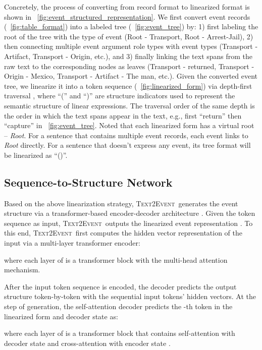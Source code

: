 \documentclass[11pt,a4paper]{article}
\newcommand\modelname{\textsc{Text2Event}}
\begin{document}
Concretely, the process of converting from record format to linearized format is shown in \figurename~\ref{fig:event_structured_representation}.
We first convert event records (\figurename~\ref{fig:table_format}) into a labeled tree (\figurename~\ref{fig:event_tree}) by:
1) first labeling the root of the tree with the type of event (Root - Transport, Root - Arrest-Jail),
2) then connecting multiple event argument role types with event types (Transport - Artifact, Transport - Origin, etc.),
and 3) finally linking the text spans from the raw text to the corresponding nodes as leaves (Transport - returned, Transport - Origin - Mexico, Transport - Artifact - The man, etc.).
Given the converted event tree, we linearize it into a token sequence (\figurename~\ref{fig:linearized_form}) via depth-first traversal \citep{NIPS2015_277281aa}, where ``('' and ``)'' are structure indicators used to represent the semantic structure of linear expressions.
The traversal order of the same depth is the order in which the text spans appear in the text, e.g., first ``return'' then ``capture'' in \figurename~\ref{fig:event_tree}.
Noted that each linearized form has a virtual root -- \textit{Root}.
For a sentence that contains multiple event records, each event links to \textit{Root} directly.
For a sentence that doesn't express any event, its tree format will be linearized as ``()''.

\subsection{Sequence-to-Structure Network}\label{sec:seq-to-structure}

Based on the above linearization strategy, \modelname\, generates the event structure via a transformer-based encoder-decoder architecture \citep{NIPS2017_3f5ee243}.
Given the token sequence  as input, \modelname\, outputs the linearized event representation .
To this end, \modelname\, first computes the hidden vector representation  of the input via a multi-layer transformer encoder: 

where each layer of  is a transformer block with the multi-head attention mechanism.

After the input token sequence is encoded, the decoder predicts the output structure token-by-token with the sequential input tokens' hidden vectors.
At the step  of generation, the self-attention decoder predicts the -th token  in the linearized form and decoder state  as:

where each layer of  is a transformer block that contains self-attention with decoder state  and cross-attention with encoder state .
\end{document}
